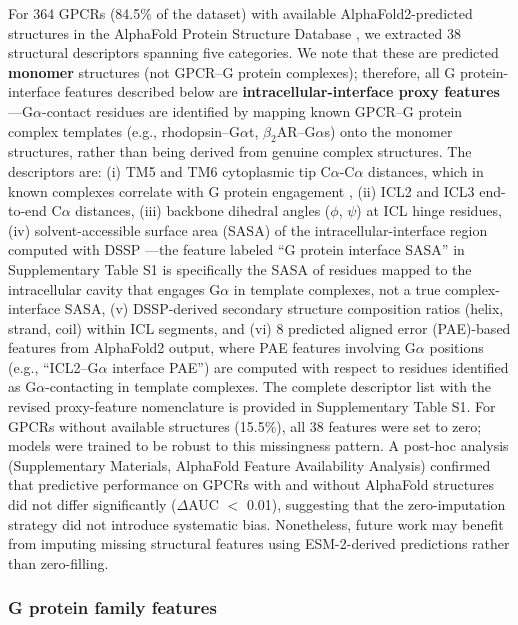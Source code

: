 \documentclass[11pt,a4paper]{article}
\begin{document}
For 364 GPCRs (84.5\% of the dataset) with available AlphaFold2-predicted structures in the AlphaFold Protein Structure Database \cite{jumper2021highly, varadi2024alphafold}, we extracted 38 structural descriptors spanning five categories. We note that these are predicted \textbf{monomer} structures (not GPCR--G protein complexes); therefore, all G protein-interface features described below are \textbf{intracellular-interface proxy features}---G$\alpha$-contact residues are identified by mapping known GPCR--G protein complex templates (e.g., rhodopsin--G$\alpha$t, $\beta_2$AR--G$\alpha$s) onto the monomer structures, rather than being derived from genuine complex structures. The descriptors are: (i) TM5 and TM6 cytoplasmic tip C$\alpha$-C$\alpha$ distances, which in known complexes correlate with G protein engagement \cite{flock2023selectivity}, (ii) ICL2 and ICL3 end-to-end C$\alpha$ distances, (iii) backbone dihedral angles ($\phi$, $\psi$) at ICL hinge residues, (iv) solvent-accessible surface area (SASA) of the intracellular-interface region computed with DSSP \cite{kabsch1983dictionary}---the feature labeled ``G protein interface SASA'' in Supplementary Table S1 is specifically the SASA of residues mapped to the intracellular cavity that engages G$\alpha$ in template complexes, not a true complex-interface SASA, (v) DSSP-derived secondary structure composition ratios (helix, strand, coil) within ICL segments, and (vi) 8 predicted aligned error (PAE)-based features from AlphaFold2 output, where PAE features involving G$\alpha$ positions (e.g., ``ICL2--G$\alpha$ interface PAE'') are computed with respect to residues identified as G$\alpha$-contacting in template complexes. The complete descriptor list with the revised proxy-feature nomenclature is provided in Supplementary Table S1. For GPCRs without available structures (15.5\%), all 38 features were set to zero; models were trained to be robust to this missingness pattern. A post-hoc analysis (Supplementary Materials, AlphaFold Feature Availability Analysis) confirmed that predictive performance on GPCRs with and without AlphaFold structures did not differ significantly ($\Delta$AUC $<$ 0.01), suggesting that the zero-imputation strategy did not introduce systematic bias. Nonetheless, future work may benefit from imputing missing structural features using ESM-2-derived predictions rather than zero-filling.

\subsubsection{G protein family features}
\end{document}

